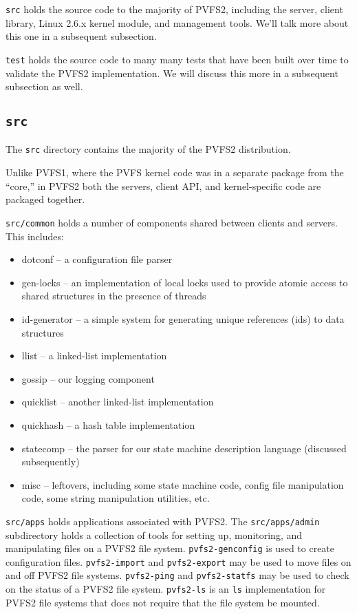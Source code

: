 \texttt{src} holds the source code to the majority of PVFS2, including the
server, client library, Linux 2.6.x kernel module, and management tools.
We'll talk more about this one in a subsequent subsection.

\texttt{test} holds the source code to many many tests that have been built
over time to validate the PVFS2 implementation.  We will discuss this more in
a subsequent subsection as well.

\subsection{\texttt{src}}

The \texttt{src} directory contains the majority of the PVFS2 distribution.

Unlike PVFS1, where the PVFS kernel code was in a separate package from the
``core,'' in PVFS2 both the servers, client API, and kernel-specific code are
packaged together.

\texttt{src/common} holds a number of components shared between clients and
servers.  This includes:
\begin{itemize}
\item dotconf -- a configuration file parser
\item gen-locks -- an implementation of local locks used to provide atomic
      access to shared structures in the presence of threads
\item id-generator -- a simple system for generating unique references (ids)
      to data structures
\item llist -- a linked-list implementation
\item gossip -- our logging component
\item quicklist -- another linked-list implementation
\item quickhash -- a hash table implementation
\item statecomp -- the parser for our state machine description language
      (discussed subsequently)
\item misc -- leftovers, including some state machine code, config file
      manipulation code, some string manipulation utilities, etc.
\end{itemize}

\texttt{src/apps} holds applications associated with PVFS2.  The
\texttt{src/apps/admin} subdirectory holds a collection of
tools for setting up, monitoring, and manipulating files on a PVFS2 file
system.  \texttt{pvfs2-genconfig} is used to create configuration files.
\texttt{pvfs2-import} and \texttt{pvfs2-export} may be used to move files on
and off PVFS2 file systems.  \texttt{pvfs2-ping} and \texttt{pvfs2-statfs} may
be used to check on the status of a PVFS2 file system.  \texttt{pvfs2-ls} is
an \texttt{ls} implementation for PVFS2 file systems that does not require
that the file system be mounted.

